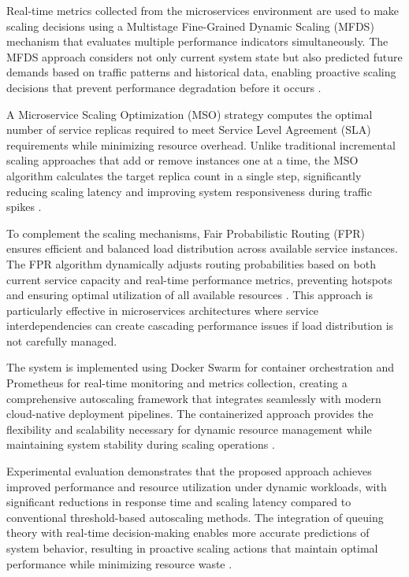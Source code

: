 Real-time metrics collected from the microservices environment are used to make scaling decisions using a Multistage Fine-Grained Dynamic Scaling (MFDS) mechanism that evaluates multiple performance indicators simultaneously. The MFDS approach considers not only current system state but also predicted future demands based on traffic patterns and historical data, enabling proactive scaling decisions that prevent performance degradation before it occurs \cite{khaleq2021}.

A Microservice Scaling Optimization (MSO) strategy computes the optimal number of service replicas required to meet Service Level Agreement (SLA) requirements while minimizing resource overhead. Unlike traditional incremental scaling approaches that add or remove instances one at a time, the MSO algorithm calculates the target replica count in a single step, significantly reducing scaling latency and improving system responsiveness during traffic spikes \cite{wang2024}.

To complement the scaling mechanisms, Fair Probabilistic Routing (FPR) ensures efficient and balanced load distribution across available service instances. The FPR algorithm dynamically adjusts routing probabilities based on both current service capacity and real-time performance metrics, preventing hotspots and ensuring optimal utilization of all available resources \cite{arulmary2026}. This approach is particularly effective in microservices architectures where service interdependencies can create cascading performance issues if load distribution is not carefully managed.

The system is implemented using Docker Swarm for container orchestration and Prometheus for real-time monitoring and metrics collection, creating a comprehensive autoscaling framework that integrates seamlessly with modern cloud-native deployment pipelines. The containerized approach provides the flexibility and scalability necessary for dynamic resource management while maintaining system stability during scaling operations \cite{fourati2021}.

Experimental evaluation demonstrates that the proposed approach achieves improved performance and resource utilization under dynamic workloads, with significant reductions in response time and scaling latency compared to conventional threshold-based autoscaling methods. The integration of queuing theory with real-time decision-making enables more accurate predictions of system behavior, resulting in proactive scaling actions that maintain optimal performance while minimizing resource waste \cite{lai2025}.


